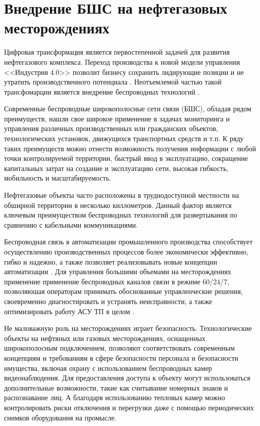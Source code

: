 \chapter{Внедрение БШС на нефтегазовых месторождениях}\label{ch:ch1}


Цифровая трансформация является первостепенной задачей для развития нефтегазового комплекса. Переход производства к новой модели управления <<Индустрия 4.0>> позволит бизнесу сохранить лидирующие позиции и не утратить производственного потенциала  \cite{Eremin2020, Dmitrievskiy2020}. Неотъемлемой частью такой трансфомарции является внедрение беспроводных технологий \cite{Eremin2020, Dmitrievskiy2020, Eremin2019, Hiriyannaiah2020, Munirathinam2020, CarmenLucas-Estan2018, Lu2019}. 


Современные беспроводные широкополосные сети связи (БШС), обладая рядом преимуществ, нашли свое широкое применение в задачах мониторинга и управления различных   производственных или гражданских объектов, технологических установок, движущихся транспортных средств и т.п. К ряду таких преимуществ можно отнести возможность получения информации с любой точки контролируемой территории, быстрый ввод в эксплуатацию, сокращение капитальных затрат на создание и эксплуатацию сети, высокая гибкость, мобильность и масштабируемость. 


Нефтегазовые объекты часто расположены в труднодоступной местности на обширной территории в несколько киллометров. Данный фактор является ключевым преимуществом беспроводных технологий для развертывания по сравнению с кабельными коммуникациями.

Беспроводная связь в автоматизации промышленного производства способствует осуществлению производственных процессов более экономически эффективно, гибко и надежно, а также позволяет реализовывать новые концепции автоматизации \cite{Gost62657}. Для управления большими объемами на месторождениях применение применение беспроводных каналов связи в режиме 60/24/7, позволяюшая операторам принимать обоснованные управленческие решения, своевременно диагностировать и устранять неисправности, а также оптимизировать работу АСУ ТП в целом \cite{Dmitrievsky2021}.

Не маловажную роль на месторождениях играет безопасность. Технологические объекты на нефтяных или газовых месторождениях, оснащенных широкополосным подключением, позволяют соответствовать современным концепциям и требованиям в сфере безопасности персонала и безопасности имущества, включая охрану с использованием беспроводных камер видеонаблюдения. Для предоставления доступа к объекту могут использоваться дополнительные возможности, такие как считывание номерных знаков и распознавание лиц. А благодаря использованию тепловых камер можно контролировать риски отключения и перегрузки даже с помощью периодических снимков оборудования на промысле. 


